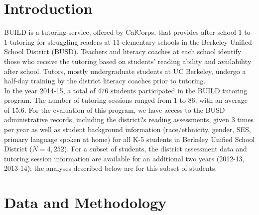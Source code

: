 \documentclass[a0,landscape]{a0poster}
\begin{document}

\begin{multicols}{3} %



\color{SaddleBrown} %

\section*{Introduction}

BUILD is a tutoring service, offered by CalCorps, that provides after-school 1-to-1 tutoring for struggling readers at 11 elementary schools in the Berkeley Unified School District (BUSD). Teachers and literacy coaches at each school identify those who receive the tutoring based on students' reading ability and availability after school. Tutors, mostly undergraduate students at UC Berkeley, undergo a half-day training by the district literacy coaches prior to tutoring. \\

In the year 2014-15, a total of 476 students participated in the BUILD tutoring program. The number of tutoring sessions ranged from 1 to 86, with an average of 15.6. For the evaluation of this program, we have access to the BUSD administrative records, including the district?s reading assessments, given 3 times per year as well as student background information (race/ethnicity, gender, SES, primary language spoken at home) for all K-5 students in Berkeley Unified School District ($N = 4,252$). For a subset of students, the district assessment data and tutoring session information are available for an additional two years (2012-13, 2013-14); the analyses described below are for this subset of students. 


\color{NavyBlue}
\section*{Data and Methodology}


\end{multicols}
\end{document}
